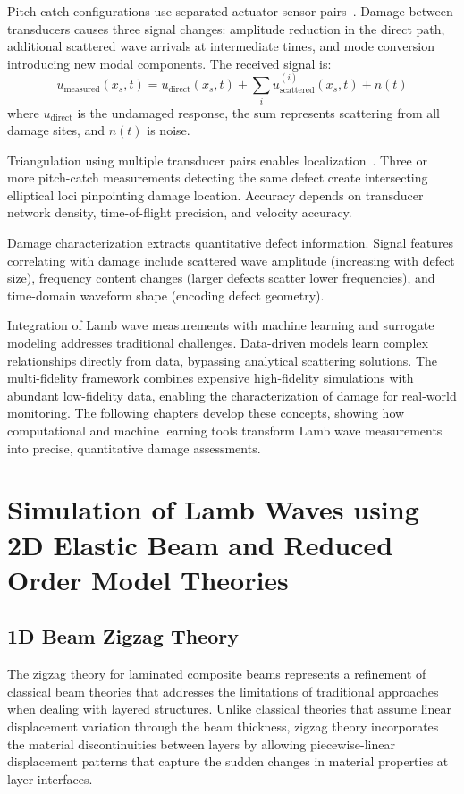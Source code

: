 \documentclass[12pt,a4paper]{report}
\begin{document}
Pitch-catch configurations use separated actuator-sensor pairs~\cite{su2009}. Damage between transducers causes three signal changes: amplitude reduction in the direct path, additional scattered wave arrivals at intermediate times, and mode conversion introducing new modal components. The received signal is:
\begin{equation}
u_{\text{measured}}(x_s, t) = u_{\text{direct}}(x_s, t) + \sum_{i} u_{\text{scattered}}^{(i)}(x_s, t) + n(t)
\end{equation}
where $u_{\text{direct}}$ is the undamaged response, the sum represents scattering from all damage sites, and $n(t)$ is noise.

Triangulation using multiple transducer pairs enables localization~\cite{giurgiutiu2008}. Three or more pitch-catch measurements detecting the same defect create intersecting elliptical loci pinpointing damage location. Accuracy depends on transducer network density, time-of-flight precision, and velocity accuracy.

Damage characterization extracts quantitative defect information. Signal features correlating with damage include scattered wave amplitude (increasing with defect size), frequency content changes (larger defects scatter lower frequencies), and time-domain waveform shape (encoding defect geometry).


Integration of Lamb wave measurements with machine learning and surrogate modeling addresses traditional challenges. Data-driven models learn complex relationships directly from data, bypassing analytical scattering solutions. The multi-fidelity framework combines expensive high-fidelity simulations with abundant low-fidelity data, enabling the characterization of damage for real-world monitoring. The following chapters develop these concepts, showing how computational and machine learning tools transform Lamb wave measurements into precise, quantitative damage assessments.

\chapter{Simulation of Lamb Waves using 2D Elastic Beam and Reduced Order Model Theories}
\label{Introduce different 1D models and a reference 2D model}

\section{1D Beam Zigzag Theory}
\label{sec:zigzag_theory}
The zigzag theory for laminated composite beams represents a refinement of classical beam theories that addresses the limitations of traditional approaches when dealing with layered structures. Unlike classical theories that assume linear displacement variation through the beam thickness, zigzag theory incorporates the material discontinuities between layers by allowing piecewise-linear displacement patterns that capture the sudden changes in material properties at layer interfaces.
\end{document}
